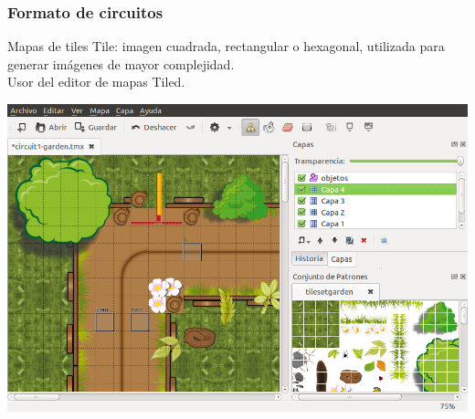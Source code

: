 \begin{frame}
    \frametitle{Formato de circuitos}

    \begin{block}{Mapas de tiles}
        Tile: imagen cuadrada, rectangular o hexagonal, utilizada para generar imágenes de mayor complejidad.\\
        Usor del editor de mapas Tiled.
    \end{block}   
    

        \begin{center}
                \includegraphics[scale=0.25]{imagenes/captura_tiled.png}
        \end{center}


\end{frame}

